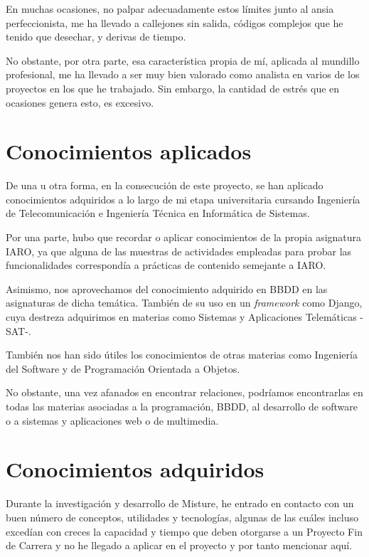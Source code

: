 En muchas ocasiones, no palpar adecuadamente estos límites junto al ansia perfeccionista, me ha llevado a callejones sin salida, códigos complejos que he tenido que desechar, y derivas de tiempo.


No obstante, por otra parte, esa característica propia de mí, aplicada al mundillo profesional, me ha llevado a ser muy bien valorado como analista en varios de los proyectos en los que he trabajado. Sin embargo, la cantidad de estrés que en ocasiones genera esto, es excesivo.

\newpage
\section{Conocimientos aplicados}

De una u otra forma, en la consecución de este proyecto, se han aplicado conocimientos adquiridos a lo largo de mi etapa universitaria cursando Ingeniería de Telecomunicación e Ingeniería Técnica en Informática de Sistemas.


Por una parte, hubo que recordar o aplicar conocimientos de la propia asignatura IARO, ya que alguna de las muestras de actividades empleadas para probar las funcionalidades correspondía a prácticas de contenido semejante a IARO.


Asimismo, nos aprovechamos del conocimiento adquirido en BBDD en las asignaturas de dicha temática. También de su uso en un \textit{framework} como Django, cuya destreza adquirimos en materias como Sistemas y Aplicaciones Telemáticas -SAT-.


También nos han sido útiles los conocimientos de otras materias como Ingeniería del Software y de Programación Orientada a Objetos.


No obstante, una vez afanados en encontrar relaciones, podríamos encontrarlas en todas las materias asociadas a la programación, BBDD, al desarrollo de software o a sistemas y aplicaciones web o de multimedia.

\newpage
\section{Conocimientos adquiridos}


Durante la investigación y desarrollo de Misture, he entrado en contacto con un buen número de conceptos, utilidades y tecnologías, algunas de las cuáles incluso excedían con creces la capacidad y tiempo que deben otorgarse a un Proyecto Fin de Carrera y no he llegado a aplicar en el proyecto y por tanto mencionar aquí.


